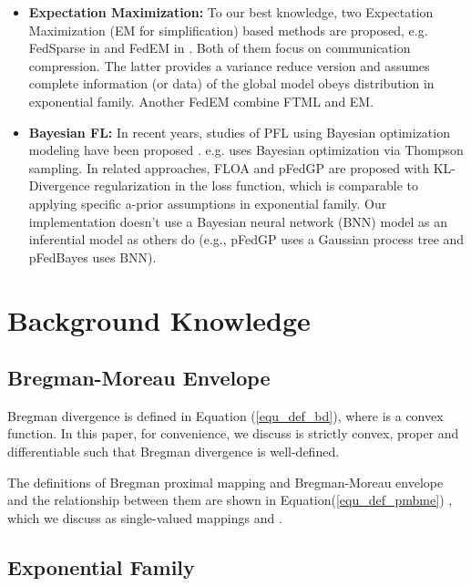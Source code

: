 \documentclass{article}
\begin{document}
\begin{itemize}
    \item \textbf{Expectation Maximization:}
        To our best knowledge, two Expectation Maximization \cite{dempster1977maximum} (EM for simplification) based methods are proposed, e.g. FedSparse in \cite{louizos2021expectation} and FedEM in \cite{dieuleveut2021federated}. Both of them focus on communication compression. The latter provides a variance reduce version and assumes complete information (or data) of the global model obeys distribution in exponential family. Another FedEM \cite{marfoq2021federated} combine FTML and EM.
    
    \item \textbf{Bayesian FL:}
        In recent years, studies of PFL using Bayesian optimization modeling have been proposed \cite{zhang2022personalized,achituve2021personalized,dai2020federated}. e.g. \cite{dai2020federated} uses Bayesian optimization via Thompson sampling.
        In related approaches, FLOA\cite{liu2021bayesian} and pFedGP\cite{achituve2021personalized} are proposed with KL-Divergence regularization in the loss function, which is comparable to applying specific a-prior assumptions in exponential family.
         Our implementation doesn’t use a Bayesian neural network (BNN) model as an inferential model as others do (e.g., pFedGP uses a Gaussian process tree and pFedBayes\cite{zhang2022personalized} uses BNN).

\end{itemize}

\section{Background Knowledge}

\subsection{Bregman-Moreau Envelope}
\label{ssec_bd}
Bregman divergence \cite{bregman1967relaxation} is defined in Equation (\ref{equ_def_bd}), where  is a convex function. In this paper, for convenience, we discuss  is strictly convex, proper and differentiable such that Bregman divergence is well-defined.

The definitions of Bregman proximal mapping and Bregman-Moreau envelope and the relationship between them are shown in Equation(\ref{equ_def_pmbme}) \cite{bauschke2006joint, bauschke2003bregman}, which we discuss as single-valued mappings and .


\subsection{Exponential Family}
\end{document}
